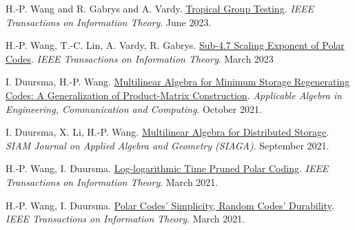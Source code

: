 \documentclass{article}
\def\sec#1{\vskip1em\textbf{\fs1#1}}
\def\fs#1{%
        \pgfmathsetmacro\a{#1}%
        \pgfmathsetmacro\A{\parskip*(4/3)^\a}%
        \pgfmathsetmacro\B{\A*(4/3)}%
        \fontsize{\A pt}{\B pt}\selectfont%
    }
\begin{document}
\bgroup
\def\section#1#2{\sec{Journal Publications \mdseries (new to old)}}
\begin{thebibliography}{J9}
    H.-P. Wang and R. Gabrys and A. Vardy.
    \href{https://ieeexplore.ieee.org/document/10146331/}
    {Tropical Group Testing}.
    \emph{IEEE Transactions on Information Theory}.
    June 2023.

    H.-P. Wang, T.-C. Lin, A. Vardy, R. Gabrys.
    \href{https://doi.org/10.1109/TIT.2023.3253074}
    {Sub-4.7 Scaling Exponent of Polar Codes}.
    \emph{IEEE Transactions on Information Theory}.
    March 2023

    I. Duursma, H.-P. Wang.
    \href{https://doi.org/10.1007/s00200-021-00526-3}
    {Multilinear Algebra for Minimum Storage Regenerating Codes: A Generalization of Product-Matrix Construction}.
    \emph{Applicable Algebra in Engineering, Communication and Computing}.
    October 2021.

    I. Duursma, X. Li, H.-P. Wang.
    \href{https://doi.org/10.1137/20M1346742}
    {Multilinear Algebra for Distributed Storage}.
    \emph{SIAM Journal on Applied Algebra and Geometry (SIAGA)}.
    September 2021.

    H.-P. Wang, I. Duursma.
    \href{https://doi.org/10.1109/TIT.2020.3041523}
    {Log-logarithmic Time Pruned Polar Coding}.
    \emph{IEEE Transactions on Information Theory}.
    March 2021.

    H.-P. Wang, I. Duursma.
    \href{https://doi.org/10.1109/TIT.2020.3041570}
    {Polar Codes' Simplicity, Random Codes' Durability}.
    \emph{IEEE Transactions on Information Theory}.
    March 2021.
\end{thebibliography}
\egroup
\end{document}
